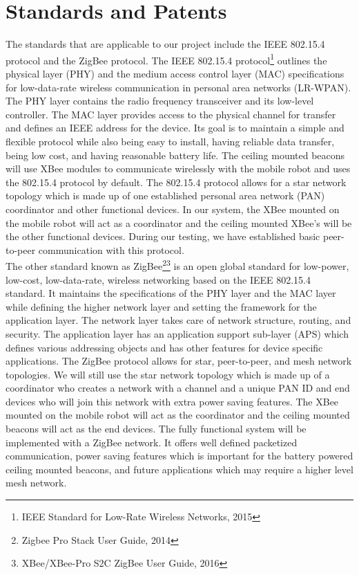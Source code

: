 \documentclass[letterpaper,12pt]{article}   %
\begin{document}
\section{Standards and Patents}
The standards that are applicable to our project include the IEEE 802.15.4 protocol and the ZigBee protocol. The IEEE 802.15.4 protocol\footnote{IEEE Standard for Low-Rate Wireless Networks, 2015} outlines the physical layer (PHY) and the medium access control layer (MAC) specifications for low-data-rate wireless communication in personal area networks (LR-WPAN). The PHY layer contains the radio frequency transceiver and its low-level controller. The MAC layer provides access to the physical channel for transfer and defines an IEEE address for the device. Its goal is to maintain a simple and flexible protocol while also being easy to install, having reliable data transfer, being low cost, and having reasonable battery life. The ceiling mounted beacons will use XBee modules to communicate wirelessly with the mobile robot and uses the 802.15.4 protocol by default. The 802.15.4 protocol allows for a star network topology which is made up of one established personal area network (PAN) coordinator and other functional devices. In our system, the XBee mounted on the mobile robot will act as a coordinator and the ceiling mounted XBee’s will be the other functional devices. During our testing, we have established basic peer-to-peer communication with this protocol.\\

The other standard known as ZigBee\footnote{Zigbee Pro Stack User Guide, 2014}\footnote{XBee/XBee-Pro S2C ZigBee User Guide, 2016} is an open global standard for low-power, low-cost, low-data-rate, wireless networking based on the IEEE 802.15.4 standard. It maintains the specifications of the PHY layer and the MAC layer while defining the higher network layer and setting the framework for the application layer. The network layer takes care of network structure, routing, and security. The application layer has an application support sub-layer (APS) which defines various addressing objects and has other features for device specific applications. The ZigBee protocol allows for star, peer-to-peer, and mesh network topologies. We will still use the star network topology which is made up of a coordinator who creates a network with a channel and a unique PAN ID and end devices who will join this network with extra power saving features. The XBee mounted on the mobile robot will act as the coordinator and the ceiling mounted beacons will act as the end devices. The fully functional system will be implemented with a ZigBee network. It offers well defined packetized communication, power saving features which is important for the battery powered ceiling mounted beacons, and future applications which may require a higher level mesh network.\\
\end{document}
